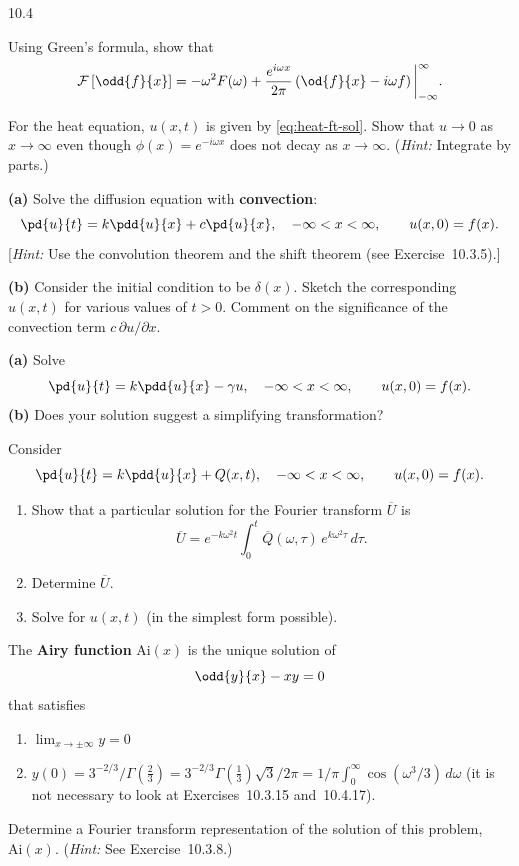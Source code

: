\begin{exercises}{10.4}
\item Using Green's formula, show that
\[
\mathcal{F}\left[\odd{f}{x}\right] = -\omega^2 F(\omega) + \frac{e^{i\omega x}}{2\pi}\left(\od{f}{x} - i\omega f\right)\bigg|_{-\infty}^{\infty}.
\]

\item For the heat equation, $u(x,t)$ is given by \eqref{eq:heat-ft-sol}.  Show that $u \to 0$ as $x \to \infty$ even though $\phi(x) = e^{-i\omega x}$ does not decay as $x \to \infty$.  (\textit{Hint:} Integrate by parts.)

\item[\starred 10.4.3.] \textbf{(a)} Solve the diffusion equation with \textbf{convection}:
\[
\pd{u}{t} = k\pdd{u}{x} + c\pd{u}{x}, \quad -\infty < x < \infty, \qquad u(x,0) = f(x).
\]
[\textit{Hint:} Use the convolution theorem and the shift theorem (see Exercise~10.3.5).]

\textbf{(b)} Consider the initial condition to be $\delta(x)$.  Sketch the corresponding $u(x,t)$ for various values of $t > 0$.  Comment on the significance of the convection term $c\,\partial u/\partial x$.

\item \textbf{(a)} Solve
\[
\pd{u}{t} = k\pdd{u}{x} - \gamma u, \quad -\infty < x < \infty, \qquad u(x,0) = f(x).
\]
\textbf{(b)} Does your solution suggest a simplifying transformation?

\item Consider
\[
\pd{u}{t} = k\pdd{u}{x} + Q(x,t), \quad -\infty < x < \infty, \qquad u(x,0) = f(x).
\]
\begin{enumerate}
\item[(a)] Show that a particular solution for the Fourier transform $\overline{U}$ is
\[
\overline{U} = e^{-k\omega^2 t}\int_0^t \overline{Q}(\omega,\tau)\,e^{k\omega^2 \tau}\,d\tau.
\]
\item[(b)] Determine $\overline{U}$.
\item[\starred (c)] Solve for $u(x,t)$ (in the simplest form possible).
\end{enumerate}

\item[\starred 10.4.6.] The \textbf{Airy function} $\text{Ai}(x)$ is the unique solution of
\[
\odd{y}{x} - xy = 0
\]
that satisfies
\begin{enumerate}
\item[(1)] $\lim_{x\to\pm\infty} y = 0$
\item[(2)] $y(0) = 3^{-2/3}/\Gamma(\frac{2}{3}) = 3^{-2/3}\Gamma(\frac{1}{3})\sqrt{3}/2\pi = 1/\pi\int_0^{\infty}\cos(\omega^3/3)\,d\omega$ (it is not necessary to look at Exercises~10.3.15 and~10.4.17).
\end{enumerate}
Determine a Fourier transform representation of the solution of this problem, $\text{Ai}(x)$.  (\textit{Hint:} See Exercise~10.3.8.)


\end{exercises}
